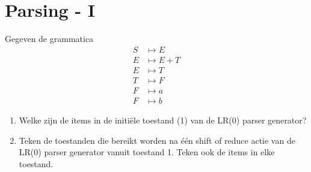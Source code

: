 \documentclass{report}
\begin{document}
	\newpage
	\section{Parsing - I}
	Gegeven de grammatica
	\begin{align*}
	S & \mapsto E \\
	E & \mapsto E + T \\
	E & \mapsto T \\
	T & \mapsto F \\
	F & \mapsto a \\
	F & \mapsto b
	\end{align*}

	\begin{enumerate}
		\item Welke zijn de items in de initiële toestand (1) van de LR(0) parser generator?
		\item Teken de toestanden die bereikt worden na één shift of reduce actie van de LR(0) parser generator vanuit toestand 1. Teken ook de items in elke toestand.
	\end{enumerate}
\end{document}
